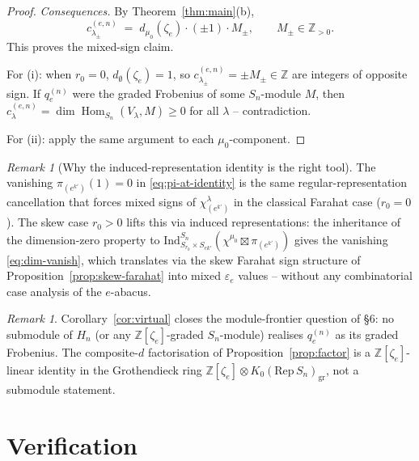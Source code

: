 \documentclass[11pt]{article}
\theoremstyle{definition}
\theoremstyle{remark}
\newtheorem{remark}[theorem]{Remark}
\DeclareMathOperator{\Hom}{Hom}
\newcommand{\qen}{q_e^{(n)}}
\newcommand{\zetae}{\zeta_e}
\newcommand{\ZZ}{\mathbb{Z}}
\begin{document}
\begin{proof}
\smallskip\emph{Consequences.} By Theorem~\ref{thm:main}(b),
\[
  c_{\lambda_\pm}^{(e,n)}
  \;=\; d_{\mu_0}(\zetae)\cdot(\pm 1)\cdot M_\pm,\qquad M_\pm\in\ZZ_{>0}.
\]
This proves the mixed-sign claim.

For (i): when $r_0=0$, $d_\emptyset(\zetae)=1$, so
$c_{\lambda_\pm}^{(e,n)}=\pm M_\pm\in\ZZ$ are integers of opposite sign.
If $\qen$ were the graded Frobenius of some $S_n$-module $M$, then
$c_\lambda^{(e,n)}=\dim\Hom_{S_n}(V_\lambda,M)\ge 0$ for all $\lambda$
-- contradiction.

For (ii): apply the same argument to each $\mu_0$-component.
\end{proof}

\begin{remark}[Why the induced-representation identity is the right tool]
The vanishing $\pi_{(e^{k'})}(1)=0$ in \eqref{eq:pi-at-identity} is the
same regular-representation cancellation that forces mixed signs of
$\chi^\lambda_{(e^{k'})}$ in the classical Farahat case ($r_0=0$).
The skew case $r_0>0$ lifts this via induced representations: the
inheritance of the dimension-zero property to
$\mathrm{Ind}_{S_{r_0}\times S_{ek'}}^{S_n}(\chi^{\mu_0}\boxtimes\pi_{(e^{k'})})$
gives the vanishing \eqref{eq:dim-vanish}, which translates via the skew
Farahat sign structure of Proposition~\ref{prop:skew-farahat} into mixed
$\varepsilon_e$ values -- without any combinatorial case analysis of the
$e$-abacus.
\end{remark}

\begin{remark}
Corollary~\ref{cor:virtual} closes the module-frontier question of
\cite{Cli26b}\S 6: no submodule of $H_n$ (or any $\ZZ[\zetae]$-graded
$S_n$-module) realises $\qen$ as its graded Frobenius. The composite-$d$
factorisation of Proposition~\ref{prop:factor} is a $\ZZ[\zetae]$-linear
identity in the Grothendieck ring $\ZZ[\zetae]\otimes K_0(\mathrm{Rep}\,S_n)_{\mathrm{gr}}$,
not a submodule statement.
\end{remark}

\section{Verification}
\label{sec:verif}
\end{document}
